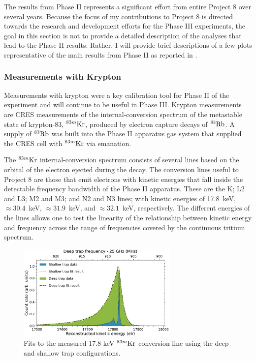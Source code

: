 The results from Phase II represents a significant effort from entire Project 8 over several years. Because the focus of my contributions to Project 8 is directed towards the research and development efforts for the Phase III experiments, the goal in this section is not to provide a detailed description of the analyses that lead to the Phase II results. Rather, I will provide brief descriptions of a few plots representative of the main results from Phase II as reported in \cite{p8prl2023,p8prc2023}.

\subsubsection*{Measurements with Krypton}

Measurements with krypton were a key calibration tool for Phase II of the experiment and will continue to be useful in Phase III. Krypton measurements are CRES measurements of the internal-conversion spectrum of the metastable state of krypton-83, $^{83m}\rm{Kr}$, produced by electron capture decays of $^{83}\rm{Rb}$. A supply of $^{83}\rm{Rb}$ was built into the Phase II apparatus gas system that supplied the CRES cell with $^{83m}\rm{Kr}$ via emanation.

The $^{83m}\rm{Kr}$ internal-conversion spectrum consists of several lines based on the orbital of the electron ejected during the decay. The conversion lines useful to Project 8 are those that emit electrons with kinetic energies that fall inside the detectable frequency bandwidth of the Phase II apparatus. These are the K; L2 and L3; M2 and M3; and N2 and N3 lines; with kinetic energies of 17.8~keV, $\approx 30.4$~keV, $\approx 31.9$~keV, and $\approx 32.1$~keV, respectively. The different energies of the lines allows one to test the linearity of the relationship between kinetic energy and frequency across the range of frequencies covered by the continuous tritium spectrum.

\begin{figure}[htbp]
    \centering
    \includegraphics[width=0.7\textwidth]{figs/Chapter-3/kr_fit.pdf}
    \caption{Fits to the measured 17.8-keV $^{83m}\rm{Kr}$ conversion line using the deep and shallow trap configurations. }
    \label{fig:chap3-krypton-spec-fit}
\end{figure}

